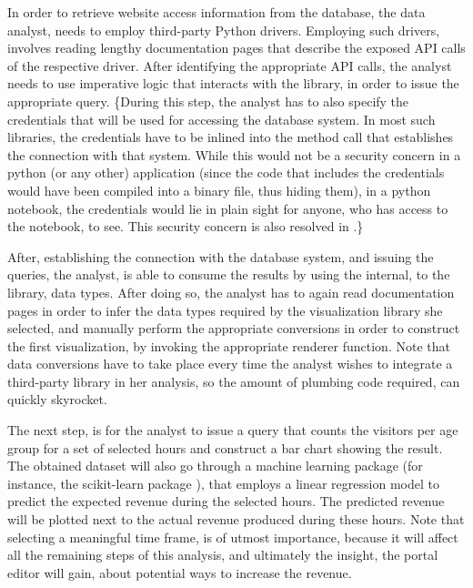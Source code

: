 In order to retrieve website access information from the database, the data analyst, needs to employ third-party Python drivers. Employing such drivers, involves reading lengthy documentation pages that describe the exposed API calls of the respective driver. After identifying the appropriate API calls, the analyst needs to use imperative logic that interacts with the library, in order to issue the appropriate query. \{During this step, the analyst has to also specify the credentials that will be used for accessing the database system. In most such libraries, the credentials have to be inlined into the method call that establishes the connection with that system. While this would not be a security concern in a python (or any other) application (since the code that includes the credentials would have been compiled into a binary file, thus hiding them), in a python notebook, the credentials would lie in plain sight for anyone, who has access to the notebook, to see. This security concern is also resolved in \projname.\} 

After, establishing the connection with the database system, and issuing the queries, the analyst, is able to consume the results by using the internal, to the library, data types. After doing so, the analyst has to again read documentation pages in order to infer the data types required by the visualization library she selected, and manually perform the appropriate conversions in order to construct the first visualization, by invoking the appropriate renderer function. Note that data conversions have to take place every time the analyst wishes to integrate a third-party library in her analysis, so the amount of plumbing code required, can quickly skyrocket.


The next step, is for the analyst to issue a query that counts the visitors per age group for a set of selected hours and construct a bar chart showing the result. The obtained dataset will also go through a machine learning package (for instance, the scikit-learn package \cite{scikit-learn}), that employs a linear regression model to predict the expected revenue during the selected hours. The predicted revenue will be plotted next to the actual revenue produced during these hours. Note that selecting a meaningful time frame, is of utmost importance, because it will affect all the remaining steps of this analysis, and ultimately the insight, the portal editor will gain, about potential ways to increase the revenue. 

